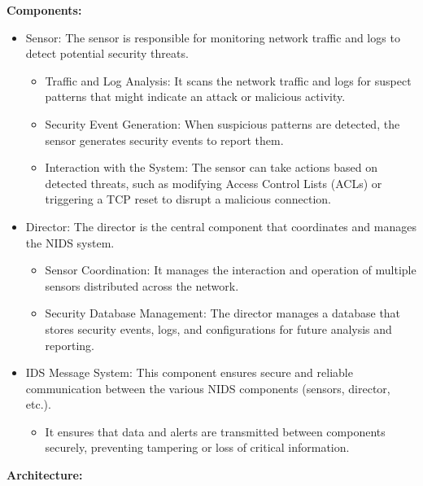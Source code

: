 \textbf{Components:}
\begin{itemize}
    \item Sensor: The sensor is responsible for monitoring network traffic and logs to detect potential security threats.
    \begin{itemize}
        \item Traffic and Log Analysis: It scans the network traffic and logs for suspect patterns that might indicate an attack or malicious activity.
        \item Security Event Generation: When suspicious patterns are detected, the sensor generates security events to report them.
        \item Interaction with the System: The sensor can take actions based on detected threats, such as modifying Access Control Lists (ACLs) or triggering a TCP reset to disrupt a malicious connection.
    \end{itemize}
    \item Director: The director is the central component that coordinates and manages the NIDS system.
    \begin{itemize}
        \item Sensor Coordination: It manages the interaction and operation of multiple sensors distributed across the network.
        \item Security Database Management: The director manages a database that stores security events, logs, and configurations for future analysis and reporting.
    \end{itemize}
    \item  IDS Message System: This component ensures secure and reliable communication between the various NIDS components (sensors, director, etc.).
    \begin{itemize}
        \item It ensures that data and alerts are transmitted between components securely, preventing tampering or loss of critical information.
    \end{itemize}
\end{itemize}

\noindent\textbf{Architecture:}

